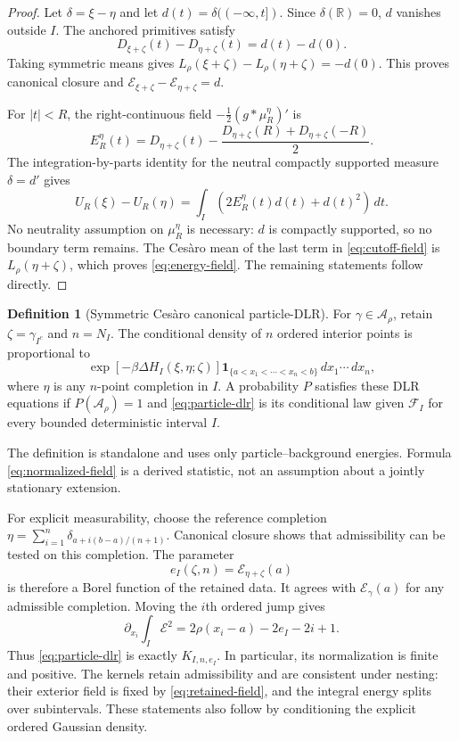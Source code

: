 \documentclass[11pt,reqno]{amsart}
\theoremstyle{definition}
\newtheorem{definition}[theorem]{Definition}
\theoremstyle{remark}
\newcommand{\R}{\mathbb R}
\newcommand{\1}{\mathbf 1}
\newcommand{\dd}{\,d}
\newcommand{\cF}{\mathcal F}
\newcommand{\cA}{\mathcal A}
\numberwithin{equation}{section}
\begin{document}
\begin{proof}
Let $\delta=\xi-\eta$ and let $d(t)=\delta(( -\infty,t])$.
Since $\delta(\R)=0$, $d$ vanishes outside $I$. The anchored
primitives satisfy
\[
D_{\xi+\zeta}(t)-D_{\eta+\zeta}(t)=d(t)-d(0).
\]
Taking symmetric means gives
$L_\rho(\xi+\zeta)-L_\rho(\eta+\zeta)=-d(0)$.
This proves canonical closure and
$\mathcal E_{\xi+\zeta}-\mathcal E_{\eta+\zeta}=d$.

For $|t|<R$, the right-continuous field $-\frac12(g*\mu_R^\eta)'$
is
\begin{equation}\label{eq:cutoff-field}
E_R^\eta(t)=D_{\eta+\zeta}(t)
-\frac{D_{\eta+\zeta}(R)+D_{\eta+\zeta}(-R)}2.
\end{equation}
The integration-by-parts identity for the neutral compactly supported
measure $\delta=d'$ gives
\[
U_R(\xi)-U_R(\eta)=\int_I\left(2E_R^\eta(t)d(t)+d(t)^2\right)\dd t.
\]
No neutrality assumption on $\mu_R^\eta$ is necessary: $d$ is compactly
supported, so no boundary term remains. The Ces\`aro mean of the last
term in \eqref{eq:cutoff-field} is $L_\rho(\eta+\zeta)$, which proves
\eqref{eq:energy-field}. The remaining statements follow directly.
\end{proof}

\begin{definition}[Symmetric Ces\`aro canonical particle-DLR]\label{def:particle-dlr}
For $\gamma\in\cA_\rho$, retain $\zeta=\gamma_{I^c}$ and $n=N_I$.
The conditional density of $n$ ordered interior points is proportional
to
\begin{equation}\label{eq:particle-dlr}
\exp[-\beta\Delta H_I(\xi,\eta;\zeta)]
\1_{\{a<x_1<\cdots<x_n<b\}}\dd x_1\cdots\dd x_n,
\end{equation}
where $\eta$ is any $n$-point completion in $I$. A probability $P$
satisfies these DLR equations if $P(\cA_\rho)=1$ and
\eqref{eq:particle-dlr} is its conditional law given $\cF_I$ for
every bounded deterministic interval $I$.
\end{definition}

The definition is standalone and uses only particle--background
energies. Formula \eqref{eq:normalized-field} is a derived statistic,
not an assumption about a jointly stationary extension.

For explicit measurability, choose the reference completion
$\eta=\sum_{i=1}^n\delta_{a+i(b-a)/(n+1)}$. Canonical closure shows
that admissibility can be tested on this completion. The parameter
\begin{equation}\label{eq:particle-coefficient}
e_I(\zeta,n)=\mathcal E_{\eta+\zeta}(a)
\end{equation}
is therefore a Borel function of the retained data. It agrees with
$\mathcal E_\gamma(a)$ for any admissible completion.
Moving the $i$th ordered jump gives
\[
\partial_{x_i}\int_I\mathcal E^2
=2\rho(x_i-a)-2e_I-2i+1.
\]
Thus \eqref{eq:particle-dlr} is exactly $K_{I,n,e_I}$. In particular,
its normalization is finite and positive. The kernels retain
admissibility and are consistent under nesting: their exterior field
is fixed by \eqref{eq:retained-field}, and the integral energy splits
over subintervals. These statements also follow by conditioning the
explicit ordered Gaussian density.
\end{document}
